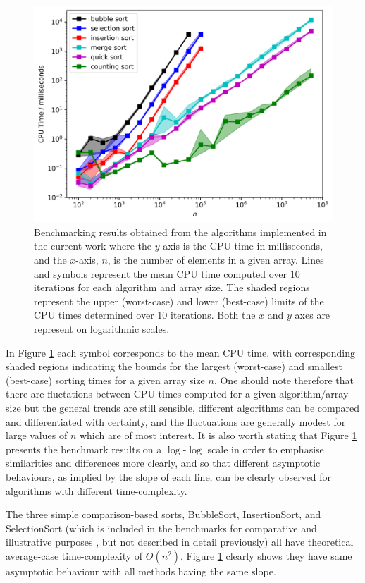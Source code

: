 \documentclass[12pt,a4paper]{article}
\begin{document}
\begin{figure}[t!]
\includegraphics[scale=0.85]{benchmark_times_vs_nsamples_log_log.png} 
\caption{Benchmarking results obtained from the algorithms implemented in the current work where the $y$-axis is the CPU time in milliseconds, and the $x$-axis, $n$, is the number of elements in a given array. Lines and symbols represent the mean CPU time computed over 10 iterations for each algorithm and array size. The shaded regions represent the upper (worst-case) and lower (best-case) limits of the CPU times determined over 10 iterations. Both the $x$ and $y$ axes are represent on logarithmic scales.}
\label{benchmark}
\end{figure}


In Figure \ref{benchmark} each symbol corresponds to the mean CPU time, with corresponding shaded regions indicating the bounds for the largest (worst-case) and smallest (best-case) sorting times for a given array size $n$. One should note therefore that there are fluctations between CPU times computed for a given algorithm/array size but the general trends are still sensible, different algorithms can be compared and differentiated with certainty, and the fluctuations are generally modest for large values of $n$ which are of most interest. It is also worth stating that Figure \ref{benchmark} presents the benchmark results on a $\log$-$\log$ scale in order to emphasise similarities and differences more clearly, and so that different asymptotic behaviours, as implied by the slope of each line, can be clearly observed for algorithms with different time-complexity.

The three simple comparison-based sorts, BubbleSort, InsertionSort, and SelectionSort (which is included in the benchmarks for comparative and illustrative purposes \cite{selection_sort}, but not described in detail previously) all have theoretical average-case time-complexity of $\Theta(n^2)$. Figure \ref{benchmark} clearly shows they have same asymptotic behaviour with all methods having the same slope. 
\end{document}
